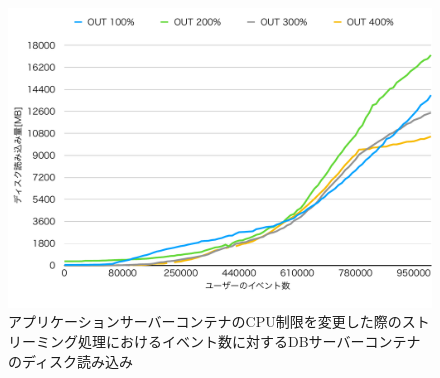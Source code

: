 \documentclass[../../../../../main]{subfiles}
\begin{document}
    \begin{figure}[H]
        \centering
        \includegraphics[width=12cm]{graph}
        \caption{アプリケーションサーバーコンテナのCPU制限を変更した際のストリーミング処理におけるイベント数に対するDBサーバーコンテナのディスク読み込み}
        \label{fig:stream-change-app-cpu-limit-db-disk-out-app_1024-db_1_1024}
    \end{figure}
\end{document}
